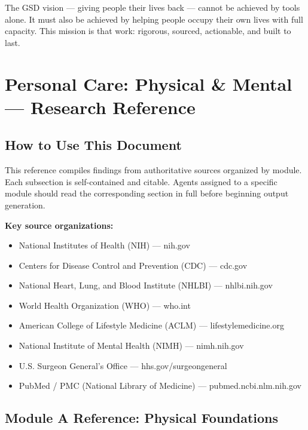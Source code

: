 \documentclass[11pt,letterpaper]{article}
\newcommand{\stageheader}[2]{%
  \noindent\colorbox{#2}{\makebox[\textwidth][l]{%
    \textcolor{white}{\bfseries\sffamily\hspace{6pt}#1\hspace{6pt}}}}%
  \vspace{0.5em}\par%
}
\begin{document}
The GSD vision --- giving people their lives back --- cannot be achieved by tools alone. It must also be achieved by helping people occupy their own lives with full capacity. This mission is that work: rigorous, sourced, actionable, and built to last.

\newpage

\stageheader{STAGE 2 --- RESEARCH REFERENCE}{secondary}

\section{Personal Care: Physical \& Mental --- Research Reference}

\subsection{How to Use This Document}

This reference compiles findings from authoritative sources organized by module. Each subsection is self-contained and citable. Agents assigned to a specific module should read the corresponding section in full before beginning output generation.

\textbf{Key source organizations:}
\begin{itemize}[leftmargin=1.5em]
  \item National Institutes of Health (NIH) --- nih.gov
  \item Centers for Disease Control and Prevention (CDC) --- cdc.gov
  \item National Heart, Lung, and Blood Institute (NHLBI) --- nhlbi.nih.gov
  \item World Health Organization (WHO) --- who.int
  \item American College of Lifestyle Medicine (ACLM) --- lifestylemedicine.org
  \item National Institute of Mental Health (NIMH) --- nimh.nih.gov
  \item U.S. Surgeon General's Office --- hhs.gov/surgeongeneral
  \item PubMed / PMC (National Library of Medicine) --- pubmed.ncbi.nlm.nih.gov
\end{itemize}

\subsection{Module A Reference: Physical Foundations}
\end{document}
